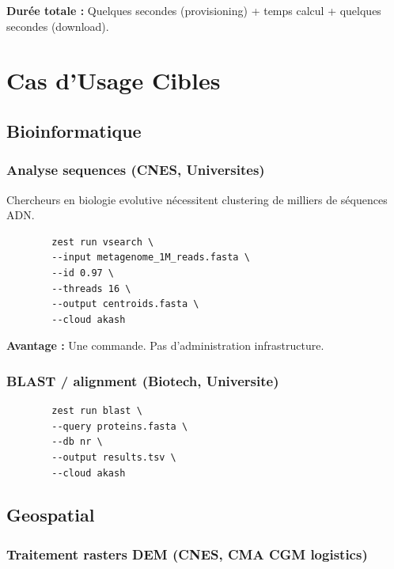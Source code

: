 \documentclass[11pt,a4paper]{article}
\begin{document}
	\textbf{Durée totale :} Quelques secondes (provisioning) + temps calcul + quelques secondes (download).
	
	\newpage
	
	\section{Cas d'Usage Cibles}
	
	\subsection{Bioinformatique}
	
	\subsubsection{Analyse sequences (CNES, Universites)}
	
	Chercheurs en biologie evolutive nécessitent clustering de milliers de séquences ADN.
	
	\begin{lstlisting}
		zest run vsearch \
		--input metagenome_1M_reads.fasta \
		--id 0.97 \
		--threads 16 \
		--output centroids.fasta \
		--cloud akash
	\end{lstlisting}
	
	\textbf{Avantage :} Une commande. Pas d'administration infrastructure.
	
	\subsubsection{BLAST / alignment (Biotech, Universite)}
	
	\begin{lstlisting}
		zest run blast \
		--query proteins.fasta \
		--db nr \
		--output results.tsv \
		--cloud akash
	\end{lstlisting}
	
	\subsection{Geospatial}
	
	\subsubsection{Traitement rasters DEM (CNES, CMA CGM logistics)}
	
\end{document}
